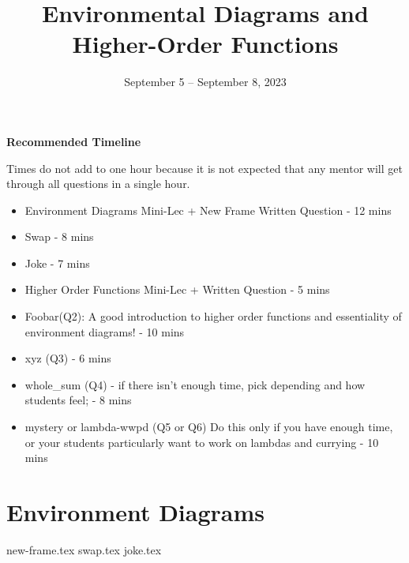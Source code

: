 \documentclass{exam}
\title{Environmental Diagrams \titlebreak and Higher-Order Functions}
\date{September 5 -- September 8, 2023}
\begin{document}
\maketitle

\begin{blocksection}
\begin{guide}
\textbf{Recommended Timeline}

Times do not add to one hour because it is not expected that any mentor will get through all questions in a single hour. 

\begin{itemize}
    \item Environment Diagrams Mini-Lec + New Frame Written Question - 12 mins
    \item Swap - 8 mins
    \item Joke - 7 mins
    \item Higher Order Functions Mini-Lec + Written Question - 5 mins
    \item Foobar(Q2): A good introduction to higher order functions and essentiality of environment diagrams! - 10 mins
    \item xyz (Q3) - 6 mins
    \item whole\_sum (Q4) - if there isn't enough time, pick depending and how students feel; - 8 mins
    \item mystery or lambda-wwpd (Q5 or Q6) Do this only if you have enough time, or your students particularly want to work on lambdas and currying - 10 mins
\end{itemize}
\end{guide}
\end{blocksection}


\section{Environment Diagrams}

\begin{questions}
{new-frame.tex}
{swap.tex}
{joke.tex}
\end{questions}
\end{document}
